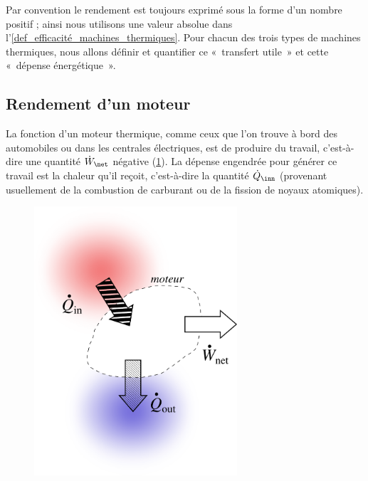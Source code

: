 	Par convention le rendement est toujours exprimé sous la forme d’un nombre positif ; ainsi nous utilisons une valeur absolue dans l’\cref{def_efficacité_machines_thermiques}. Pour chacun des trois types de machines thermiques, nous allons définir et quantifier ce «~transfert utile~» et cette «~dépense énergétique~».


	\subsection{Rendement d’un moteur}
	\label{ch_rendement_moteur}

		La fonction d’un moteur thermique, comme ceux que l’on trouve à bord des automobiles ou dans les centrales électriques, est de produire du travail, c’est-à-dire une quantité $\dot W_\net$ négative (\cref{fig_transferts_moteur}). La dépense engendrée pour générer ce travail est la chaleur qu’il reçoit, c’est-à-dire la quantité $\dot Q_\inn$ (provenant usuellement de la combustion de carburant ou de la fission de noyaux atomiques).

		\begin{figure}
			\begin{center}
				\includegraphics[height=10cm]{images/efficacite_moteur.png}
			\end{center}
			\label{fig_transferts_moteur}
		\end{figure}

